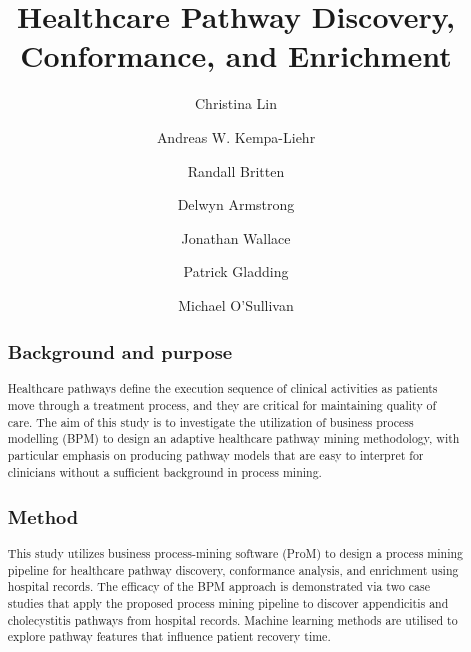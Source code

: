 \documentclass{elsarticle}
\begin{document}
\begin{frontmatter}

\title{Healthcare Pathway Discovery, Conformance, and Enrichment}


\author[mymainaddress]{Christina Lin}
\author[mymainaddress]{Andreas W. Kempa-Liehr}

\author[Orion]{Randall Britten}
\author[Waitemata]{Delwyn Armstrong}
\author[Waitemata]{Jonathan Wallace}
\author[Waitemata]{Patrick Gladding}
\author[mymainaddress]{ Michael O'Sullivan}

\address[mymainaddress]{Department of Engineering Science, The University of Auckland, 70 Symonds St, Grafton, Auckland, New Zealand}
\address[Orion]{Orion Health, 181 Grafton Rd, Grafton, Auckland, New Zealand}
\address[Waitemata]{Waitemata District Health Board, 124 Shakespeare Rd, Takapuna, Auckland, New Zealand
}

\begin{abstract}
\subsection*{Background and purpose}
Healthcare pathways define the execution sequence of clinical activities as patients move through a treatment process, and they are critical for maintaining quality of care. The aim of this study is to investigate the utilization of business process modelling (BPM) to design an adaptive healthcare pathway mining methodology, with particular emphasis on producing pathway models that are easy to interpret for clinicians without a sufficient background in process mining.

\subsection*{Method}
This study utilizes business process-mining software (ProM) to design a process mining pipeline for healthcare pathway discovery, conformance analysis, and enrichment using hospital records. The efficacy of the BPM approach is demonstrated via two case studies that apply the proposed process mining pipeline to discover appendicitis and cholecystitis pathways from hospital records. Machine learning methods are utilised to explore pathway features that influence patient recovery time.


\end{abstract}
\end{frontmatter}
\end{document}
